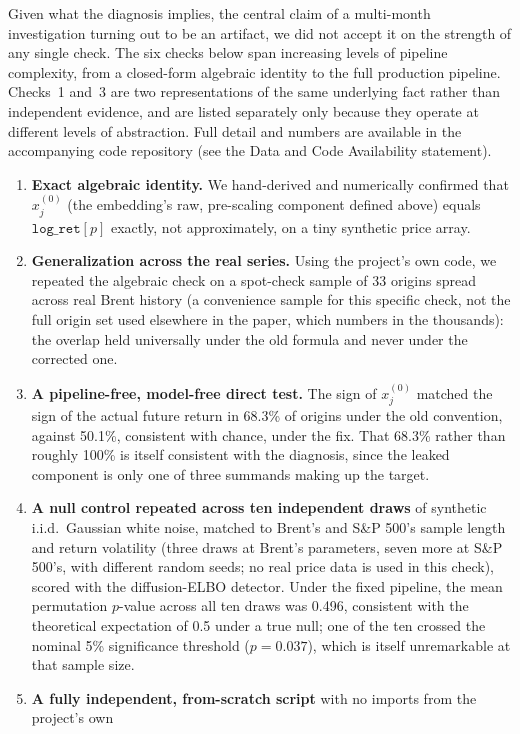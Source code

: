 \documentclass[preprint,12pt]{elsarticle}
\begin{document}
Given what the diagnosis implies, the central claim of a multi-month investigation turning out
to be an artifact, we did not accept it on the strength of any single check. The six checks
below span increasing levels of pipeline complexity, from a closed-form algebraic identity to
the full production pipeline. Checks~1 and~3 are two representations of the same underlying
fact rather than independent evidence, and are listed separately only because they operate at
different levels of abstraction. Full detail and numbers are available in the accompanying
code repository (see the Data and Code Availability statement).

\begin{enumerate}
\item \textbf{Exact algebraic identity.} We hand-derived and numerically confirmed that
$x_j^{(0)}$ (the embedding's raw, pre-scaling component defined above) equals
$\texttt{log\_ret}[p]$ exactly, not approximately, on a tiny synthetic price array.
\item \textbf{Generalization across the real series.} Using the project's own code, we
repeated the algebraic check on a spot-check sample of 33 origins spread across real Brent
history (a convenience sample for this specific check, not the full origin set used elsewhere in
the paper, which numbers in the thousands): the overlap held universally under the old formula
and never under the corrected one.
\item \textbf{A pipeline-free, model-free direct test.} The sign of $x_j^{(0)}$ matched the
sign of the actual future return in 68.3\% of origins under the old convention, against
50.1\%, consistent with chance, under the fix. That 68.3\% rather than roughly 100\% is itself
consistent with the diagnosis, since the leaked component is only one of three summands making
up the target.
\item \textbf{A null control repeated across ten independent draws} of synthetic i.i.d.\ Gaussian
white noise, matched to Brent's and S\&P 500's sample length and return volatility (three draws
at Brent's parameters, seven more at S\&P 500's, with different random seeds; no real price data
is used in this check), scored with the diffusion-ELBO detector. Under the fixed pipeline, the mean permutation
$p$-value across all ten draws was 0.496, consistent with the theoretical expectation of 0.5
under a true null; one of the ten crossed the nominal 5\% significance threshold ($p=0.037$),
which is itself unremarkable at that sample size.
\item \textbf{A fully independent, from-scratch script} with no imports from the project's own

\end{enumerate}
\end{document}
